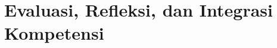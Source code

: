 \documentclass[../../main.tex]{subfiles}
\begin{document}
\chapter{Evaluasi, Refleksi, dan Integrasi Kompetensi}
\label{chap:evaluasi-akhir}

















\ifSubfilesClassLoaded{%
  \clearpage
}{}
\end{document}
